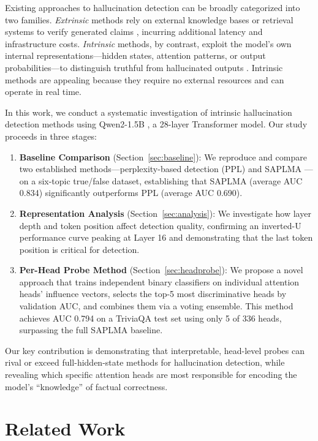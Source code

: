 \documentclass[11pt]{article}
\begin{document}
Existing approaches to hallucination detection can be broadly categorized into two families. \emph{Extrinsic} methods rely on external knowledge bases or retrieval systems to verify generated claims \citep{manakul2023selfcheckgpt}, incurring additional latency and infrastructure costs. \emph{Intrinsic} methods, by contrast, exploit the model's own internal representations---hidden states, attention patterns, or output probabilities---to distinguish truthful from hallucinated outputs \citep{azaria2023internal, burns2022discovering}. Intrinsic methods are appealing because they require no external resources and can operate in real time.

In this work, we conduct a systematic investigation of intrinsic hallucination detection methods using Qwen2-1.5B \citep{qwen2024qwen2}, a 28-layer Transformer model. Our study proceeds in three stages:

\begin{enumerate}
    \item \textbf{Baseline Comparison} (Section~\ref{sec:baseline}): We reproduce and compare two established methods---perplexity-based detection (PPL) and SAPLMA \citep{azaria2023internal}---on a six-topic true/false dataset, establishing that SAPLMA (average AUC 0.834) significantly outperforms PPL (average AUC 0.690).
    \item \textbf{Representation Analysis} (Section~\ref{sec:analysis}): We investigate how layer depth and token position affect detection quality, confirming an inverted-U performance curve peaking at Layer 16 and demonstrating that the last token position is critical for detection.
    \item \textbf{Per-Head Probe Method} (Section~\ref{sec:headprobe}): We propose a novel approach that trains independent binary classifiers on individual attention heads' influence vectors, selects the top-5 most discriminative heads by validation AUC, and combines them via a voting ensemble. This method achieves AUC 0.794 on a TriviaQA test set using only 5 of 336 heads, surpassing the full SAPLMA baseline.
\end{enumerate}

Our key contribution is demonstrating that interpretable, head-level probes can rival or exceed full-hidden-state methods for hallucination detection, while revealing which specific attention heads are most responsible for encoding the model's ``knowledge'' of factual correctness.

\section{Related Work}
\end{document}

